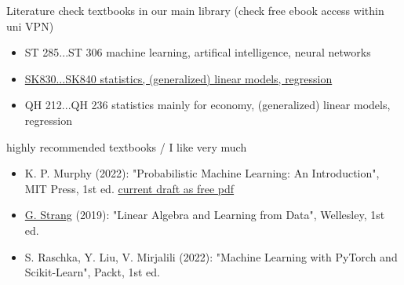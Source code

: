\documentclass[mathserif, aspectratio=1610]{intbeamer}
\begin{document}
\begin{frame}{Literature}
  check textbooks in our main library (check free ebook access within uni VPN)
  \begin{itemize}
    \item ST 285...ST 306 machine learning, artifical intelligence, neural networks
    \item \href{https://find.ub.uni-rostock.de/sk830}{SK830...SK840 statistics, (generalized) linear models, regression}
    \item QH 212...QH 236 statistics mainly for economy, (generalized) linear models, regression
  \end{itemize}
  \vspace{1cm}
  highly recommended textbooks / I like very much
  \begin{itemize}
    \item K. P. Murphy (2022): "Probabilistic Machine Learning: An Introduction", MIT Press, 1st ed.
    \href{https://probml.github.io/pml-book/book1.html}{current draft as free pdf}
    \item \href{https://math.mit.edu/~gs/}{G. Strang} (2019): "Linear Algebra and Learning from Data", Wellesley, 1st ed.
    \item S. Raschka, Y. Liu, V. Mirjalili (2022): "Machine Learning with PyTorch and Scikit-Learn", Packt, 1st ed.
  \end{itemize}
\end{frame}
\end{document}
